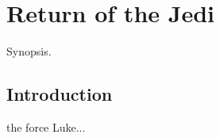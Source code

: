 \chapter{Return of the Jedi}
	\label{chapter:return-of-the-jedi}%



\begin{synopsis}
	Synopsis.
\end{synopsis}


\section{Introduction}

 the force Luke...

